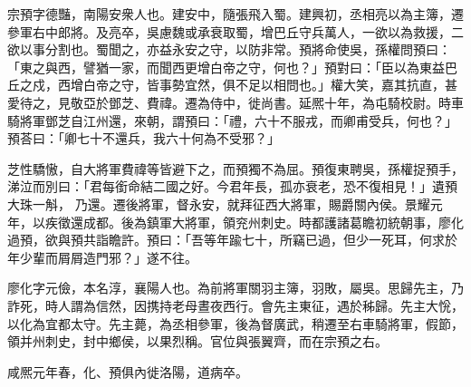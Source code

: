 \begin{pinyinscope}
 
 
 宗預字德豔，南陽安衆人也。建安中，隨張飛入蜀。建興初，丞相亮以為主簿，遷參軍右中郎將。及亮卒，吳慮魏或承衰取蜀，增巴丘守兵萬人，一欲以為救援，二欲以事分割也。蜀聞之，亦益永安之守，以防非常。預將命使吳，孫權問預曰：「東之與西，譬猶一家，而聞西更增白帝之守，何也？」預對曰：「臣以為東益巴丘之戍，西增白帝之守，皆事勢宜然，俱不足以相問也。」權大笑，嘉其抗直，甚愛待之，見敬亞於鄧芝、費禕。遷為侍中，徙尚書。延熈十年，為屯騎校尉。時車騎將軍鄧芝自江州還，來朝，謂預曰：「禮，六十不服戎，而卿甫受兵，何也？」預荅曰：「卿七十不還兵，我六十何為不受邪？」
 
 
 芝性驕慠，自大將軍費禕等皆避下之，而預獨不為屈。預復東聘吳，孫權捉預手，涕泣而別曰：「君每銜命結二國之好。今君年長，孤亦衰老，恐不復相見！」遺預大珠一斛，
 乃還。遷後將軍，督永安，就拜征西大將軍，賜爵關內侯。景耀元年，以疾徵還成都。後為鎮軍大將軍，領兖州刺史。時都護諸葛瞻初統朝事，廖化過預，欲與預共詣瞻許。預曰：「吾等年踰七十，所竊已過，但少一死耳，何求於年少輩而屑屑造門邪？」遂不往。
 
 
廖化字元儉，本名淳，襄陽人也。為前將軍關羽主簿，羽敗，屬吳。思歸先主，乃詐死，時人謂為信然，因携持老母晝夜西行。會先主東征，遇於秭歸。先主大恱，以化為宜都太守。先主薨，為丞相參軍，後為督廣武，稍遷至右車騎將軍，假節，領并州刺史，封中鄉侯，以果烈稱。官位與張翼齊，而在宗預之右。
 
 
 
 
 咸熈元年春，化、預俱內徙洛陽，道病卒。
 
 
\end{pinyinscope}
